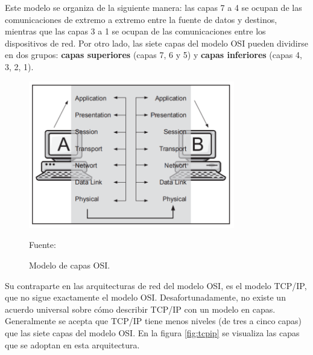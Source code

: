 Este modelo se organiza de la siguiente manera: las capas 7 a 4 se ocupan de las comunicaciones de extremo a extremo entre la fuente de datos y destinos, mientras que las capas 3 a 1 se ocupan de las comunicaciones entre los dispositivos de red. Por otro lado, las siete capas del modelo OSI pueden dividirse en dos grupos: \textbf{capas superiores} (capas 7, 6 y 5) y \textbf{capas inferiores} (capas 4, 3, 2, 1).\\

\begin{figure}[H]
    \begin{center}
        \includegraphics[width=9cm]{img/capitulo_2/capas.png}
    \end{center}
    \begin{center}
        \caption{Modelo de capas OSI.}
        Fuente: \protect\cite[3]{networkProtocolos:handbook}
        \label{fig:osi}
    \end{center}
\end{figure}

Su contraparte en las arquitecturas de red del modelo OSI, es el modelo TCP/IP, que no sigue exactamente el modelo OSI. Desafortunadamente, no existe un acuerdo universal sobre cómo describir TCP/IP con un modelo en capas. Generalmente se acepta que TCP/IP tiene menos niveles (de tres a cinco capas) que las siete capas del modelo OSI. En la figura \ref{fig:tcpip} se visualiza las capas que se adoptan en esta arquitectura.\\

